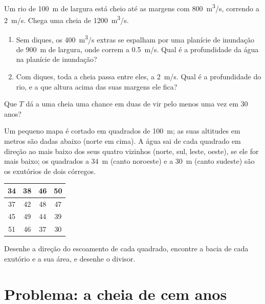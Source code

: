 \begin{exercise}[$\star\star\star$]\label{exo:g10:drainage-basins:13}
Um rio de \qty{100}{m} de largura está cheio até as margens com
\qty{800}{m^3/s}, correndo a \qty{2}{m/s}. Chega uma cheia de
\qty{1200}{m^3/s}.
\begin{enumerate}
  \item Sem diques, os \qty{400}{m^3/s} extras se espalham por uma planície
        de inundação de \qty{900}{m} de largura, onde correm a
        \qty{0.5}{m/s}. Qual é a profundidade da água na planície de
        inundação?
  \item Com diques, toda a cheia passa entre eles, a \qty{2}{m/s}. Qual é a
        profundidade do rio, e a que altura acima das suas margens ele
        fica?
\end{enumerate}
\end{exercise}

\begin{exercise}[$\star\star\star$]\label{exo:g10:drainage-basins:14}
Que  $T$ dá a uma cheia uma chance em duas de vir pelo
menos uma vez em \num{30} anos?
\end{exercise}

\begin{exercise}[$\star\star\star$]\label{exo:g10:drainage-basins:15}
Um pequeno mapa é cortado em quadrados de \qty{100}{m}; as suas altitudes em
metros são dadas abaixo (norte em cima). A água sai de cada quadrado em
direção ao mais baixo dos seus quatro vizinhos (norte, sul, leste, oeste),
se ele for mais baixo; os quadrados a \qty{34}{m} (canto noroeste) e a
\qty{30}{m} (canto sudeste) são os exutórios de dois córregos.
\begin{center}
\begin{tabular}{|c|c|c|c|}
\hline
34 & 38 & 46 & 50 \\ \hline
37 & 42 & 48 & 47 \\ \hline
45 & 49 & 44 & 39 \\ \hline
51 & 46 & 37 & 30 \\ \hline
\end{tabular}
\end{center}
Desenhe a direção do escoamento de cada quadrado, encontre a bacia de cada
exutório e a sua área, e desenhe o divisor.
\end{exercise}

\section{Problema: a cheia de cem anos}

